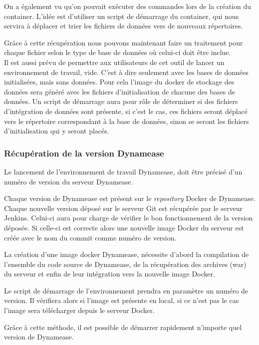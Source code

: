 On a également vu qu'on pouvait exécuter des commandes lors de la création du container. L'idée est d'utiliser un script de démarrage du container, qui nous servira à déplacer et trier les fichiers de données vers de nouveaux répertoires.

Grâce à cette récupération nous pouvons maintenant faire un traitement pour chaque fichier selon le type de base de données où celui-ci doit être inclue.\\

Il est aussi prévu de permettre aux utilisateurs de cet outil de lancer un environnement de travail, vide. C'est à dire seulement avec les bases de données initialisées, mais sans données. Pour cela l'image du docker de stockage des données sera généré avec les fichiers d'initialisation de chacune des bases de données. Un script de démarrage aura pour rôle de déterminer si des fichiers d'intégration de données sont présente, si c'est le cas, ces fichiers seront déplacé vers le répertoire correspondant à la base de données, sinon se seront les fichiers d'initialisation qui y seront placés. 

\subsubsection{Récupération de la version Dynamease}

Le lancement de l'environnement de travail Dynamease, doit être précisé d'un numéro de version du serveur Dynamease. 

Chaque version de Dynamease est présent sur le \textit{repository} Docker de Dynamease. Chaque nouvelle version déposé sur le serveur Git est récupérée par le serveur Jenkins. Celui-ci aura pour charge de vérifier le bon fonctionnement de la version déposée. Si celle-ci est correcte alors une nouvelle image Docker du serveur est créée avec le nom du commit comme numéro de version.

La création d'une image docker Dynamease, nécessite d'abord la compilation de l'ensemble du code source de Dynamease, de la récupération des archives (war) du serveur et enfin de leur intégration vers la nouvelle image Docker.

Le script de démarrage de l'environnement prendra en paramètre un numéro de version. Il vérifiera alors si l'image est présente en local, si ce n'est pas le cas l'image sera télécharger depuis le serveur Docker.

Grâce à cette méthode, il est possible de démarrer rapidement n'importe quel version de Dynamease.

